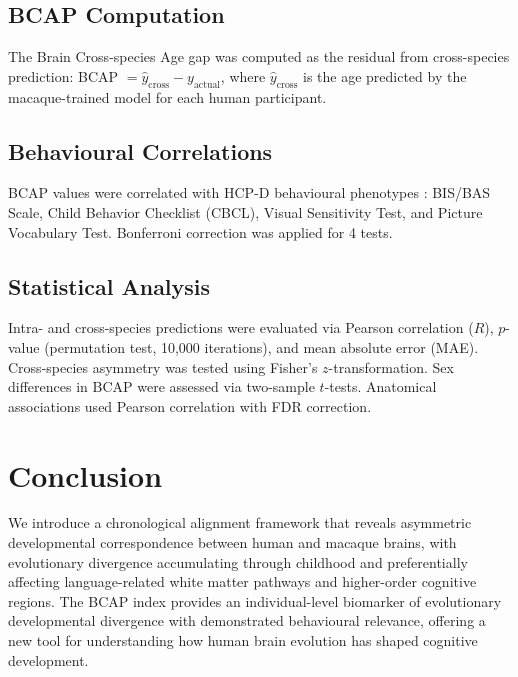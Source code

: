 \documentclass[11pt]{article}
\begin{document}
\subsection{BCAP Computation}
The Brain Cross-species Age gap was computed as the residual from cross-species prediction: BCAP $= \hat{y}_{\text{cross}} - y_{\text{actual}}$, where $\hat{y}_{\text{cross}}$ is the age predicted by the macaque-trained model for each human participant.

\subsection{Behavioural Correlations}
BCAP values were correlated with HCP-D behavioural phenotypes \citep{gershon2013nih, luciana2018adolescent}: BIS/BAS Scale, Child Behavior Checklist (CBCL), Visual Sensitivity Test, and Picture Vocabulary Test. Bonferroni correction was applied for 4 tests.

\subsection{Statistical Analysis}
Intra- and cross-species predictions were evaluated via Pearson correlation ($R$), $p$-value (permutation test, 10,000 iterations), and mean absolute error (MAE). Cross-species asymmetry was tested using Fisher's $z$-transformation. Sex differences in BCAP were assessed via two-sample $t$-tests. Anatomical associations used Pearson correlation with FDR correction.

\section{Conclusion}

We introduce a chronological alignment framework that reveals asymmetric developmental correspondence between human and macaque brains, with evolutionary divergence accumulating through childhood and preferentially affecting language-related white matter pathways and higher-order cognitive regions. The BCAP index provides an individual-level biomarker of evolutionary developmental divergence with demonstrated behavioural relevance, offering a new tool for understanding how human brain evolution has shaped cognitive development.



\end{document}
